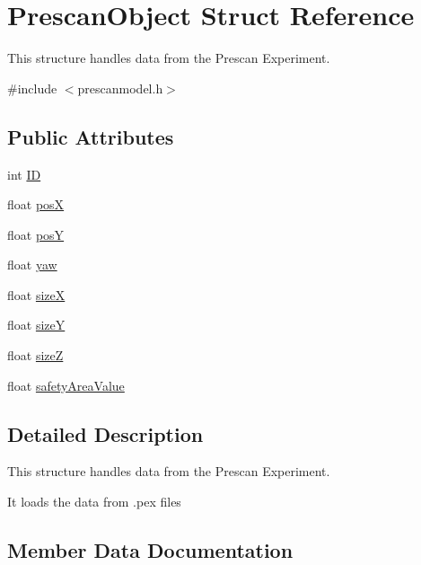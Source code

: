\hypertarget{structPrescanObject}{}\section{Prescan\+Object Struct Reference}
\label{structPrescanObject}


This structure handles data from the Prescan Experiment.  




{\ttfamily \#include $<$prescanmodel.\+h$>$}

\subsection*{Public Attributes}
\begin{DoxyCompactItemize}
\item 
int \hyperlink{structPrescanObject_af7e41b4fddaccbc1d484aaec6885a858}{ID}
\item 
float \hyperlink{structPrescanObject_a10e370108cc4ba111f311c3ec8676c75}{posX}
\item 
float \hyperlink{structPrescanObject_ac8baaf74bcbda492a48630b7b05e6c9d}{posY}
\item 
float \hyperlink{structPrescanObject_ad769052d95fb1e3a416e6d01aa1d3171}{yaw}
\item 
float \hyperlink{structPrescanObject_a6916422735a67e4cf94f90fdc121a60d}{sizeX}
\item 
float \hyperlink{structPrescanObject_a9c405367213c8e3ccc96e476903ca876}{sizeY}
\item 
float \hyperlink{structPrescanObject_ad0f71d984cb7b023167718522ef6f00e}{sizeZ}
\item 
float \hyperlink{structPrescanObject_ab53724a8381fbce7e3f1f618b9bba6cd}{safety\+Area\+Value}
\end{DoxyCompactItemize}


\subsection{Detailed Description}
This structure handles data from the Prescan Experiment. 

It loads the data from .pex files 

\subsection{Member Data Documentation}
\mbox{\label{structPrescanObject_af7e41b4fddaccbc1d484aaec6885a858}} 
